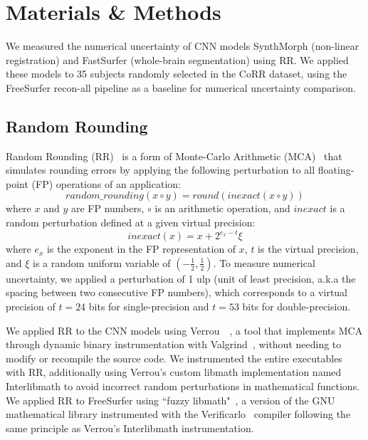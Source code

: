 \section*{Materials \& Methods}

We measured the numerical uncertainty of CNN models SynthMorph (non-linear registration) and FastSurfer (whole-brain segmentation) using RR. We applied these models to 35 subjects randomly selected in the CoRR dataset, using the FreeSurfer recon-all pipeline as a baseline for numerical uncertainty comparison. 

\subsection{Random Rounding}


Random Rounding (RR)~\cite{forsythe1959reprint} is a form of Monte-Carlo Arithmetic (MCA)~\cite{parker1997monte} that simulates rounding errors by applying the following perturbation to all floating-point (FP) operations of an application:
\[
  random\_rounding(x \circ y) = round(inexact(x \circ y))
\]
where $x$ and $y$ are FP numbers, $\circ$ is an arithmetic operation, and $inexact$ is a random perturbation defined at a given virtual precision:
\[
inexact(x)=x+2^{e_{x}-t}\xi
\]
where \(e_{x}\) is the exponent in the FP representation of \(x\), \(t\) is the virtual precision, and \(\xi\) is a random uniform variable of \((-\frac{1}{2},\frac{1}{2})\).
To measure numerical uncertainty, we applied a perturbation of 1 ulp (unit of least precision, a.k.a the spacing between two consecutive FP numbers), which corresponds to a virtual precision of $t=24$ bits for single-precision and $t=53$ bits for double-precision.

We applied RR to the CNN models using Verrou~\cite{fevotte2016verrou}~\cite{verrou-url}, a tool that implements MCA through dynamic binary instrumentation with Valgrind~\cite{nethercote2007valgrind}, without needing to modify or recompile the source code.  We instrumented the entire executables with RR, additionally using Verrou's custom libmath implementation named Interlibmath to avoid incorrect random perturbations in mathematical functions. We applied RR to FreeSurfer using ``fuzzy libmath"~\cite{salari2021accurate}, a version of the GNU mathematical library instrumented with the Verificarlo~\cite{denis2015verificarlo} compiler following the same principle as Verrou's Interlibmath instrumentation.

